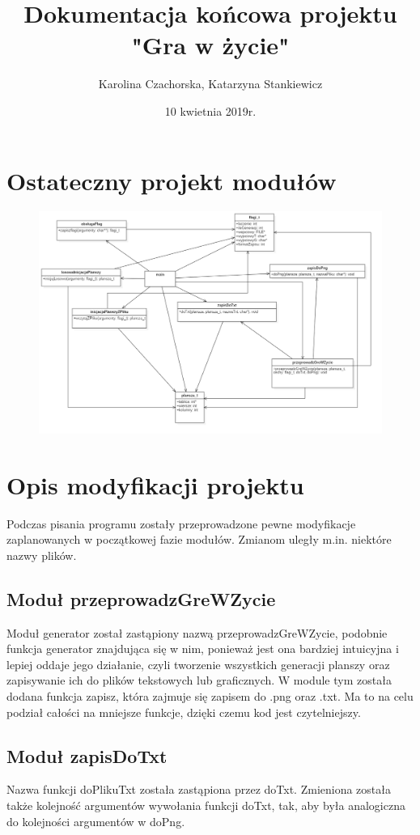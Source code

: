 \documentclass[10pt, oneside]{article}
\title{Dokumentacja końcowa projektu "Gra w życie"}
\author{Karolina Czachorska, Katarzyna Stankiewicz}
\date{10 kwietnia 2019r.}
\begin{document}
\maketitle
\tableofcontents
\newpage	
\section{Ostateczny projekt modułów}

 
\begin{figure}[H]
	\centering
	\includegraphics[width=13cm]{Main.png}
\end{figure}

\section{Opis modyfikacji projektu}
Podczas pisania programu zostały przeprowadzone pewne modyfikacje zaplanowanych w początkowej fazie modułów. Zmianom uległy m.in. niektóre nazwy plików. 

\subsection{Moduł przeprowadzGreWZycie}
Moduł generator został zastąpiony nazwą przeprowadzGreWZycie, podobnie funkcja generator znajdująca się w nim, ponieważ jest ona bardziej intuicyjna i lepiej oddaje jego działanie, czyli tworzenie wszystkich generacji planszy oraz zapisywanie ich do plików tekstowych lub graficznych. W module tym została dodana funkcja zapisz, która zajmuje się zapisem do .png oraz .txt. Ma to na celu podział całości na mniejsze funkcje, dzięki czemu kod jest czytelniejszy. 
\subsection{Moduł zapisDoTxt}
Nazwa funkcji doPlikuTxt została zastąpiona przez doTxt. Zmieniona została także kolejność argumentów wywołania funkcji doTxt, tak, aby była analogiczna do kolejności argumentów w doPng. 
\end{document}
